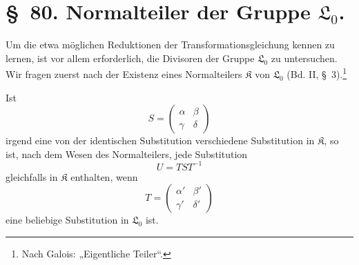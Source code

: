 \documentclass[11pt]{article}
\providecommand{\Lzero}{\mathfrak L_0}
\providecommand{\Kgrp}{\mathfrak K}
\begin{document}
\section*{\S~80. Normalteiler der Gruppe $\Lzero$.}

Um die etwa möglichen Reduktionen der Transformationsgleichung kennen zu lernen, ist vor allem erforderlich, die Divisoren der Gruppe $\Lzero$ zu untersuchen. Wir fragen zuerst nach der Existenz eines Normalteilers $\Kgrp$ von $\Lzero$ (Bd. II, \S~3).\footnote{Nach Galois: „Eigentliche Teiler“.}

Ist
\begin{equation}
 S=\begin{pmatrix}\alpha&\beta\\\gamma&\delta\end{pmatrix}
\tag{1}
\end{equation}
irgend eine von der identischen Substitution verschiedene Substitution in $\Kgrp$, so ist, nach dem Wesen des Normalteilers, jede Substitution
\begin{equation}
 U=TST^{-1}
\tag{2}
\end{equation}
gleichfalls in $\Kgrp$ enthalten, wenn
\begin{equation}
 T=\begin{pmatrix}\alpha'&\beta'\\\gamma'&\delta'\end{pmatrix}
\tag{3}
\end{equation}
eine beliebige Substitution in $\Lzero$ ist.
\end{document}
